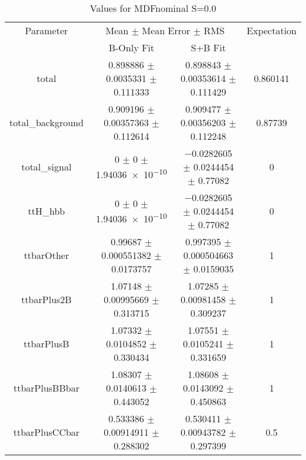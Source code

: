 \begin{table}
\centering
\caption{Values for MDFnominal S=0.0}
\begin{tabular}{cccc}
\toprule
Parameter & \multicolumn{2}{c}{Mean $\pm$ Mean Error $\pm$ RMS} & Expectation\\
 & B-Only Fit & S+B Fit & \\
\midrule
total & \num{0.898886} $\pm$ \num{0.0035331} $\pm$ \num{0.111333} & \num{0.898843} $\pm$ \num{0.00353614} $\pm$ \num{0.111429} & \num{0.860141}\\
total\_background & \num{0.909196} $\pm$ \num{0.00357363} $\pm$ \num{0.112614} & \num{0.909477} $\pm$ \num{0.00356203} $\pm$ \num{0.112248} & \num{0.87739}\\
total\_signal & \num{0} $\pm$ \num{0} $\pm$ \num{1.94036e-10} & \num{-0.0282605} $\pm$ \num{0.0244454} $\pm$ \num{0.77082} & \num{0}\\
ttH\_hbb & \num{0} $\pm$ \num{0} $\pm$ \num{1.94036e-10} & \num{-0.0282605} $\pm$ \num{0.0244454} $\pm$ \num{0.77082} & \num{0}\\
ttbarOther & \num{0.99687} $\pm$ \num{0.000551382} $\pm$ \num{0.0173757} & \num{0.997395} $\pm$ \num{0.000504663} $\pm$ \num{0.0159035} & \num{1}\\
ttbarPlus2B & \num{1.07148} $\pm$ \num{0.00995669} $\pm$ \num{0.313715} & \num{1.07285} $\pm$ \num{0.00981458} $\pm$ \num{0.309237} & \num{1}\\
ttbarPlusB & \num{1.07332} $\pm$ \num{0.0104852} $\pm$ \num{0.330434} & \num{1.07551} $\pm$ \num{0.0105241} $\pm$ \num{0.331659} & \num{1}\\
ttbarPlusBBbar & \num{1.08307} $\pm$ \num{0.0140613} $\pm$ \num{0.443052} & \num{1.08608} $\pm$ \num{0.0143092} $\pm$ \num{0.450863} & \num{1}\\
ttbarPlusCCbar & \num{0.533386} $\pm$ \num{0.00914911} $\pm$ \num{0.288302} & \num{0.530411} $\pm$ \num{0.00943782} $\pm$ \num{0.297399} & \num{0.5}\\
\bottomrule
\end{tabular}
\end{table}
